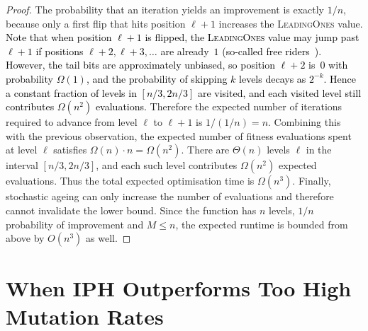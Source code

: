 \documentclass[lettersize,journal]{IEEEtran}
\newcommand{\rerev}[1]{\textcolor{black}{#1}}
\begin{document}
\begin{proof}
The probability that an iteration yields an improvement is exactly $1/n$, because only a first flip that hits position $\ell+1$ increases the \textsc{LeadingOnes} value. \rerev{Note that when position $\ell+1$ is flipped, the \textsc{LeadingOnes} value may jump past $\ell+1$ if positions $\ell+2, \ell+3, \ldots$ are already~$1$ (so-called free riders~\cite{DrosteJansenWegener2002}). However, the tail bits are approximately unbiased, so position $\ell+2$ is~$0$ with probability $\Omega(1)$, and the probability of skipping $k$ levels decays as $2^{-k}$. Hence a constant fraction of levels in $[n/3, 2n/3]$ are visited, and each visited level still contributes $\Omega(n^2)$ evaluations.} Therefore the expected number of iterations required to advance from level $\ell$ to $\ell+1$ is $1/(1/n)=n$. Combining this with the previous observation, the expected number of fitness evaluations spent at level $\ell$ satisfies $\Omega(n)\cdot n=\Omega(n^2)$.
There are $\Theta(n)$ levels $\ell$ in the interval $[n/3,2n/3]$, and each such level contributes $\Omega(n^2)$ expected evaluations. Thus the total expected optimisation time is $\Omega(n^3)$. Finally, stochastic ageing can only increase the number of evaluations and therefore cannot invalidate the lower bound. Since the function has $n$ levels, $1/n$ probability of improvement and $M\leq n$, the expected runtime is bounded from above by $O(n^3)$ as well.


\end{proof}

 

\section{When IPH Outperforms Too High Mutation Rates}
\end{document}
